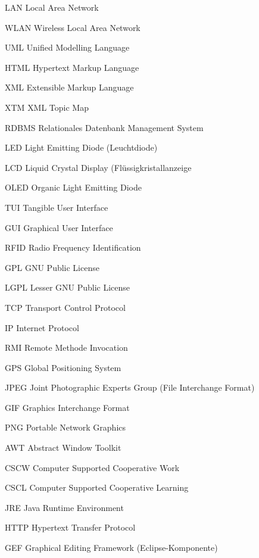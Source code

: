 {LAN}
{Local Area Network}

{WLAN}
{Wireless Local Area Network}

{UML}
{Unified Modelling Language}

{HTML}
{Hypertext Markup Language}

{XML}
{Extensible Markup Language}

{XTM}
{XML Topic Map}

{RDBMS}
{Relationales Datenbank Management System}

{LED}
{Light Emitting Diode (Leuchtdiode)}

{LCD}
{Liquid Crystal Display (Flüssigkristallanzeige}

{OLED}
{Organic Light Emitting Diode}

{TUI}
{Tangible User Interface}

{GUI}
{Graphical User Interface}

{RFID}
{Radio Frequency Identification}

{GPL}
{GNU Public License}

{LGPL}
{Lesser GNU Public License}

{TCP}
{Transport Control Protocol}

{IP}
{Internet Protocol}

{RMI}
{Remote Methode Invocation}

{GPS}
{Global Positioning System}

{JPEG}
{Joint Photographic Experts Group (File Interchange Format)}

{GIF}
{Graphics Interchange Format}

{PNG}
{Portable Network Graphics}

{AWT}
{Abstract Window Toolkit}

{CSCW}
{Computer Supported Cooperative Work}

{CSCL}
{Computer Supported Cooperative Learning}

{JRE}
{Java Runtime Environment}

{HTTP}
{Hypertext Transfer Protocol}

{GEF}
{Graphical Editing Framework (Eclipse-Komponente)}

